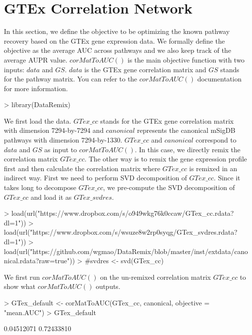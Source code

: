 \documentclass{article}
\begin{document}
\section{GTEx Correlation Network}
In this section, we define the objective to be optimizing the known pathway recovery based on the GTEx gene expression data. We formally define the objective as the average AUC across pathways and we also keep track of the average AUPR value. $corMatToAUC()$ is the main objective function with two inputs: $data$ and $GS$. $data$ is the GTEx gene correlation matrix and $GS$ stands for the pathway matrix.  You can refer to the $corMatToAUC()$ documentation for more information.
\begin{Schunk}
\begin{Sinput}
> library(DataRemix)
\end{Sinput}
\end{Schunk}
We first load the data. $GTex\_cc$ stands for the GTEx gene correlation matrix with dimension 7294-by-7294 and $canonical$ represents the canonical mSigDB pathways with dimension 7294-by-1330. $GTex\_cc$ and $canonical$ correspond to $data$ and $GS$ as input to $corMatToAUC()$. In this case, we directly remix the correlation matrix $GTex\_cc$. The other way is to remix the gene expression profile first and then calculate the correlation matrix where $GTex\_cc$ is remixed in an indirect way. First we need to perform SVD decomposition of $GTex\_cc$. Since it takes long to decompose $GTex\_cc$, we pre-compute the SVD decomposition of $GTex\_cc$ and load it as $GTex\_svdres$.
\begin{Schunk}
\begin{Sinput}
> load(url("https://www.dropbox.com/s/o949wkg76k0ccaw/GTex_cc.rdata?dl=1"))
> load(url("https://www.dropbox.com/s/wsuze8w2rp0syqg/GTex_svdres.rdata?dl=1"))
> load(url("https://github.com/wgmao/DataRemix/blob/master/inst/extdata/canonical.rdata?raw=true"))
> #svdres <- svd(GTex_cc)
\end{Sinput}
\end{Schunk}
We first run $corMatToAUC()$ on the un-remixed correlation matrix $GTex\_cc$ to show what $corMatToAUC()$ outputs.
\begin{Schunk}
\begin{Sinput}
> GTex_default <- corMatToAUC(GTex_cc, canonical, objective = "mean.AUC")
> GTex_default
\end{Sinput}
\begin{Soutput}
[1] 0.04512071 0.72433810
\end{Soutput}
\end{Schunk}
\end{document}
